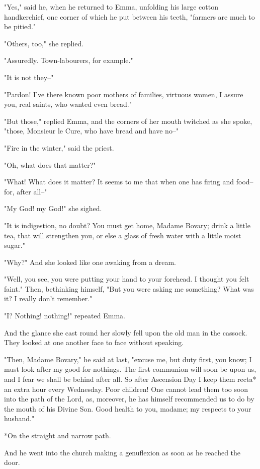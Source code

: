 \documentclass[11pt,twocolumn]{ltugboat}
\begin{document}
"Yes," said he, when he returned to Emma, unfolding his large cotton
handkerchief, one corner of which he put between his teeth, "farmers are
much to be pitied."

"Others, too," she replied.

"Assuredly. Town-labourers, for example."

"It is not they--"

"Pardon! I've there known poor mothers of families, virtuous women, I
assure you, real saints, who wanted even bread."

"But those," replied Emma, and the corners of her mouth twitched as she
spoke, "those, Monsieur le Cure, who have bread and have no--"

"Fire in the winter," said the priest.

"Oh, what does that matter?"

"What! What does it matter? It seems to me that when one has firing and
food--for, after all--"

"My God! my God!" she sighed.

"It is indigestion, no doubt? You must get home, Madame Bovary; drink
a little tea, that will strengthen you, or else a glass of fresh water
with a little moist sugar."

"Why?" And she looked like one awaking from a dream.

"Well, you see, you were putting your hand to your forehead. I thought
you felt faint." Then, bethinking himself, "But you were asking me
something? What was it? I really don't remember."

"I? Nothing! nothing!" repeated Emma.

And the glance she cast round her slowly fell upon the old man in the
cassock. They looked at one another face to face without speaking.

"Then, Madame Bovary," he said at last, "excuse me, but duty first, you
know; I must look after my good-for-nothings. The first communion will
soon be upon us, and I fear we shall be behind after all. So after
Ascension Day I keep them recta* an extra hour every Wednesday. Poor
children! One cannot lead them too soon into the path of the Lord, as,
moreover, he has himself recommended us to do by the mouth of his Divine
Son. Good health to you, madame; my respects to your husband."

     *On the straight and narrow path.

And he went into the church making a genuflexion as soon as he reached
the door.
\end{document}
